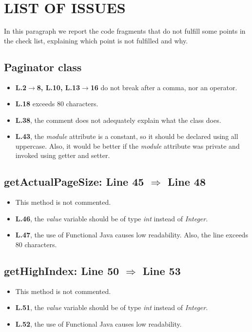 \section{LIST OF ISSUES}
In this paragraph we report the code fragments that do not fulfill some points in the check list, explaining which point is not fulfilled and why.

\subsection{Paginator class}
\begin{itemize}
	\item \textbf{L.2$\rightarrow$8, L.10, L.13$\rightarrow$16} do not break after a comma, nor an operator.
	\item \textbf{L.18} exceeds 80 characters.
	\item \textbf{L.38}, the comment does not adequately explain what the class does.
	\item \textbf{L.43}, the \textit{module} attribute is a constant, so it should be declared using all uppercase. Also, it would be better if the \textit{module} attribute was private and invoked using getter and setter.
\end{itemize}
\subsection{getActualPageSize: Line 45 $\Rightarrow$ Line 48}
\begin{itemize}
	\item This method is not commented.
	\item \textbf{L.46}, the \textit{value} variable should be of type \textit{int} instead of \textit{Integer}.
	\item \textbf{L.47}, the use of Functional Java causes low readability. Also, the line exceeds 80 characters.
\end{itemize}

\subsection{getHighIndex: Line 50 $\Rightarrow$ Line 53}
\begin{itemize}
	\item This method is not commented.
	\item \textbf{L.51}, the \textit{value} variable should be of type \textit{int} instead of \textit{Integer}.
	\item \textbf{L.52}, the use of Functional Java causes low readability.
\end{itemize}

